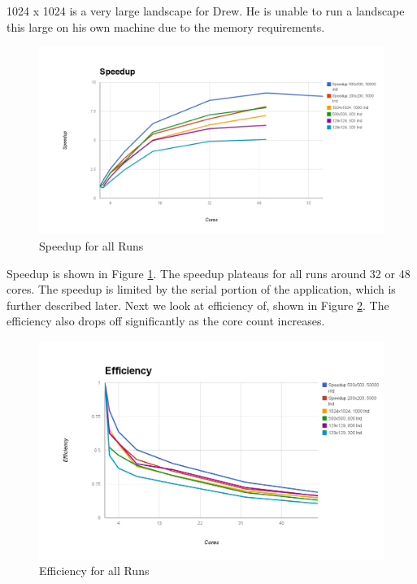 \documentclass[12pt, notitlepage]{article}
\begin{document}
1024 x 1024 is a very large landscape for Drew.  He is unable to run a landscape this large on his own machine due to the memory requirements.

\begin{figure}[ht]
\includegraphics[width=\textwidth]{Include/SpeedupRuns.png}
\caption{Speedup for all Runs} \label{fig:speedup}
\end{figure}


Speedup is shown in Figure \ref{fig:speedup}.  The speedup plateaus for all runs around 32 or 48 cores.  The speedup is limited by the serial portion of the application, which is further described later.  Next we look at efficiency of, shown in Figure \ref{fig:efficiency}.  The efficiency also drops off significantly as the core count increases.

\begin{figure}[ht]
\includegraphics[width=\textwidth]{Include/Efficiency.png}
\caption{Efficiency for all Runs} \label{fig:efficiency}
\end{figure}
\end{document}
